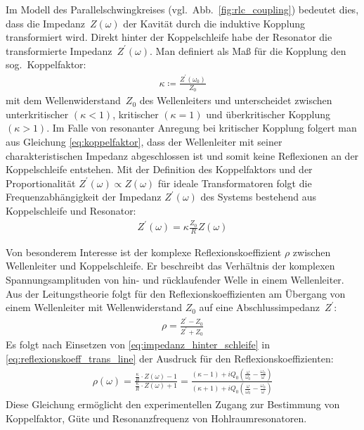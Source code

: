 Im Modell des Parallelschwingkreises (vgl.\ Abb.\ \ref{fig:rlc_coupling}) bedeutet dies, dass die Impedanz~$Z(\omega)$ der Kavität durch die induktive Kopplung transformiert wird.
Direkt hinter der Koppelschleife habe der Resonator die transformierte Impedanz~$Z^\prime(\omega)$.
Man definiert als Maß für die Kopplung den sog.\ Koppelfaktor:
\begin{align}
  \kappa \coloneqq \frac{Z^\prime(\omega_0)}{Z_0}
  \label{eq:koppelfaktor}
\end{align}
mit dem Wellenwiderstand~$Z_0$ des Wellenleiters und unterscheidet zwischen unterkritischer $(\kappa < 1)$, kritischer $(\kappa = 1)$ und überkritischer Kopplung $(\kappa > 1)$.
Im Falle von resonanter Anregung bei kritischer Kopplung folgert man aus Gleichung \eqref{eq:koppelfaktor}, dass der Wellenleiter mit seiner charakteristischen Impedanz abgeschlossen ist und somit keine Reflexionen an der Koppelschleife entstehen.
Mit der Definition des Koppelfaktors und der Proportionalität $Z^\prime(\omega) \propto Z(\omega)$ für ideale Transformatoren folgt die Frequenzabhängigkeit der Impedanz $Z^\prime(\omega)$ des Systems bestehend aus Koppelschleife und Resonator:
\begin{align}
  Z^\prime(\omega) = \kappa \frac{Z_0}{R} Z(\omega)
  \label{eq:impedanz_hinter_schleife}
\end{align}

Von besonderem Interesse ist der komplexe Reflexionskoeffizient $\rho$ zwischen Wellenleiter und Koppelschleife.
Er beschreibt das Verhältnis der komplexen Spannungsamplituden von hin- und rücklaufender Welle in einem Wellenleiter.
Aus der Leitungstheorie \cite[S.\ 57]{pozar} folgt für den Reflexionskoeffizienten am Übergang von einem Wellenleiter mit Wellenwiderstand $Z_0$ auf eine Abschlussimpedanz~$Z^\prime$:
\begin{align}
  \rho = \frac{Z^\prime - Z_0}{Z^\prime + Z_0}
  \label{eq:reflexionskoeff_trans_line}
\end{align}
Es folgt nach Einsetzen von \eqref{eq:impedanz_hinter_schleife} in \eqref{eq:reflexionskoeff_trans_line} der Ausdruck für den Reflexionskoeffizienten:
\begin{align}
  \rho(\omega) = \frac{\frac{\kappa}{R} \cdot Z(\omega) - 1}{\frac{\kappa}{R} \cdot Z(\omega) + 1} = \frac{(\kappa - 1) + i  Q_0 \left( \frac{\omega}{\omega_0}  - \frac{\omega_0}{\omega}\right)}{\left( \kappa + 1 \right) + i  Q_0 \left( \frac{\omega}{\omega_0}  - \frac{\omega_0}{\omega}\right)}
\end{align}
Diese Gleichung ermöglicht den experimentellen Zugang zur Bestimmung von Koppelfaktor, Güte und Resonanzfrequenz von Hohlraumresonatoren.


